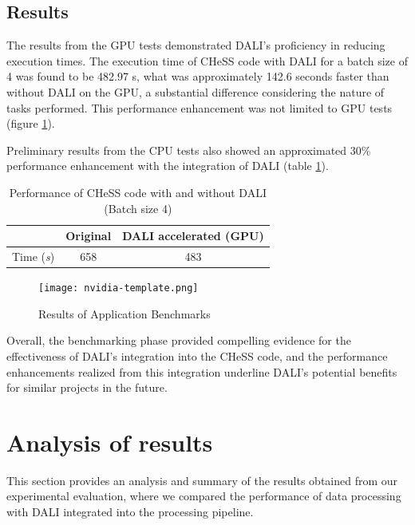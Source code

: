 \documentclass[licencjacka,en]{pracamgr}
\begin{document}
\subsection{Results}

The results from the GPU tests demonstrated DALI's proficiency in reducing execution times. The execution time of CHeSS code with DALI for a batch size of 4 was found to be 482.97 s, what was approximately 142.6 seconds faster than without DALI on the GPU, a substantial difference considering the nature of tasks performed. This performance enhancement was not limited to GPU tests (figure \ref{CHeSS}). 

Preliminary results from the CPU tests also showed an approximated 30\% performance enhancement with the integration of DALI (table \ref{CHeSS}).



% 


\renewcommand{\arraystretch}{2}
\begin{table}[H]
    \centering
    \begin{tabular}{|c|c|c|}
        \hline
        & Original & DALI accelerated (GPU) \\\hline
        Time (\textit{s}) & 658 & 483  \\\hline
    \end{tabular}
    \caption{\label{CHeSS} Performance of CHeSS code with and without DALI (Batch size 4)}
\end{table}

\begin{figure}[ht]
\centering
\texttt{[image: nvidia-template.png]}
\caption{\label{application-results}Results of Application Benchmarks}
\end{figure}


Overall, the benchmarking phase provided compelling evidence for the effectiveness of DALI's integration into the CHeSS code, and the performance enhancements realized from this integration underline DALI's potential benefits for similar projects in the future.


\section{Analysis of results}

This section provides an analysis and summary of the results obtained from our experimental evaluation, where we compared the performance of data processing with DALI integrated into the processing pipeline. 
\end{document}
